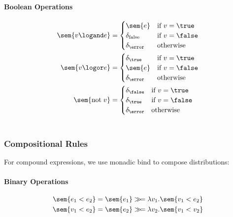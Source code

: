 \paragraph{Boolean Operations}
\begin{align*}
%
\sem{ v \logand e } & = \begin{cases}
	\sem{ e } & \text{if $v=\true$} \\
	\delta_{\text{false}} & \text{if $v=\false$} \\
	\delta_\error & \text{otherwise}
\end{cases} \\ 
%
%
\sem{ v \logor e } & = \begin{cases}
	\delta_\true & \text{if $v=\true$} \\
	\sem{ e } & \text{if $v=\false$} \\
	\delta_\error & \text{otherwise}
\end{cases} \\ 
%
%
\sem{ \text{not}\; v } &= 
 \begin{cases}
	\delta_\false & \text{if $v=\true$} \\
	\delta_\true & \text{if $v=\false$} \\
	\delta_\error & \text{otherwise}
\end{cases} \\ 
 \\
%
\end{align*}
%


\subsubsection{Compositional Rules}

For compound expressions, we use monadic bind to compose distributions:

\paragraph{Binary Operations}
\begin{align*}
\sem{ e_1 < e_2 } &= \sem{ e_1 } \gg\!= \lambda v_1. \sem{ v_1 < e_2 } \\
\sem{ v_1 < e_2 } &= \sem{ e_2 } \gg\!= \lambda v_2. \sem{ v_1 < v_2 }
\end{align*}

